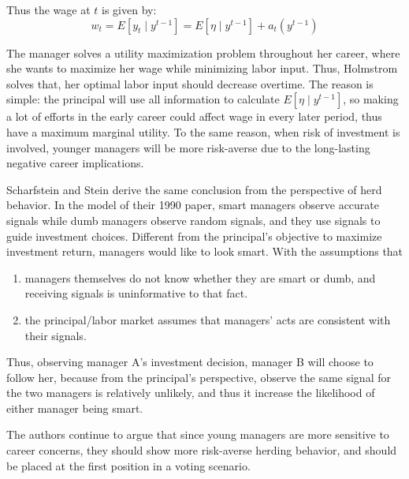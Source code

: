 \documentclass{article}
\begin{document}
\begin{CJK}{UTF8}{gbsn}
Thus the wage at $t$ is given by:
$$
w_{t}=E\left[y_{t} \mid y^{t-1}\right]=E\left[\eta \mid y^{t-1}\right]+a_{t}\left(y^{t-1}\right)
$$

The manager solves a utility maximization problem throughout her career, where she wants to maximize her wage while minimizing labor input. Thus, Holmstrom solves that, her optimal labor input should decrease overtime. The reason is simple: the principal will use all information to calculate $E\left[\eta \mid y^{t-1}\right]$, so making a lot of efforts in the early career could affect wage in every later period, thus have a maximum marginal utility. To the same reason, when risk of investment is involved, younger managers will be more risk-averse due to the long-lasting negative career implications. 

Scharfstein and Stein derive the same conclusion from the perspective of herd behavior. In the model of their 1990 paper\cite{herd behavior}, smart managers observe accurate signals while dumb managers observe random signals, and they use signals to guide investment choices. Different from the principal's objective to maximize investment return, managers would like to look smart. With the assumptions that 

\begin{enumerate}
  \item managers themselves do not know whether they are smart or dumb, and receiving signals is uninformative to that fact.
  \item the principal/labor market assumes that managers' acts are consistent with their signals.
\end{enumerate}
Thus, observing manager A's investment decision, manager B will choose to follow her, because from the principal's perspective, observe the same signal for the two managers is relatively unlikely, and thus it increase the likelihood of either manager being smart. 

The authors continue to argue that since young managers are more sensitive to career concerns, they should show more risk-averse herding behavior, and should be placed at the first position in a voting scenario. 




\end{CJK}
\end{document}
